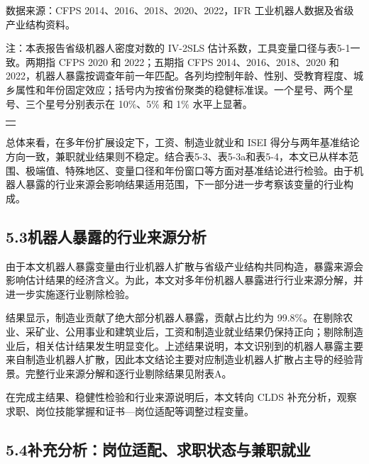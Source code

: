 数据来源：CFPS 2014、2016、2018、2020、2022，IFR 工业机器人数据及省级产业结构资料。

注：本表报告省级机器人密度对数的 IV-2SLS 估计系数，工具变量口径与表5-1一致。两期指 CFPS 2020 和 2022；五期指 CFPS 2014、2016、2018、2020 和 2022，机器人暴露按调查年前一年匹配。各列均控制年龄、性别、受教育程度、城乡属性和年份固定效应；括号内为按省份聚类的稳健标准误。一个星号、两个星号、三个星号分别表示在 10\%、5\% 和 1\% 水平上显著。

{\def\LTcaptype{none} %
\begin{longtable}[]{@{}
  >{\raggedright\arraybackslash}p{}@{}}
\toprule\noalign{}
\endhead
\bottomrule\noalign{}
\endlastfoot
 \\
\end{longtable}
}

总体来看，在多年份扩展设定下，工资、制造业就业和 ISEI 得分与两年基准结论方向一致，兼职就业结果则不稳定。结合表5-3、表5-3a和表5-4，本文已从样本范围、极端值、特殊地区、变量口径和年份窗口等方面对基准结论进行检验。由于机器人暴露的行业来源会影响结果适用范围，下一部分进一步考察该变量的行业构成。

\subsection{5.3机器人暴露的行业来源分析}\label{ux673aux5668ux4ebaux66b4ux9732ux7684ux884cux4e1aux6765ux6e90ux5206ux6790}

由于本文机器人暴露变量由行业机器人扩散与省级产业结构共同构造，暴露来源会影响估计结果的经济含义。为此，本文对多年份机器人暴露进行行业来源分解，并进一步实施逐行业剔除检验。

结果显示，制造业贡献了绝大部分机器人暴露，贡献占比约为 99.8\%。在剔除农业、采矿业、公用事业和建筑业后，工资和制造业就业结果仍保持正向；剔除制造业后，相关估计结果发生明显变化。上述结果说明，本文识别到的机器人暴露主要来自制造业机器人扩散，因此本文结论主要对应制造业机器人扩散占主导的经验背景。完整行业来源分解和逐行业剔除结果见附表A。

在完成主结果、稳健性检验和行业来源说明后，本文转向 CLDS 补充分析，观察求职、岗位技能掌握和证书---岗位适配等调整过程变量。

\subsection{5.4补充分析：岗位适配、求职状态与兼职就业}\label{ux8865ux5145ux5206ux6790ux5c97ux4f4dux9002ux914dux6c42ux804cux72b6ux6001ux4e0eux517cux804cux5c31ux4e1a}

